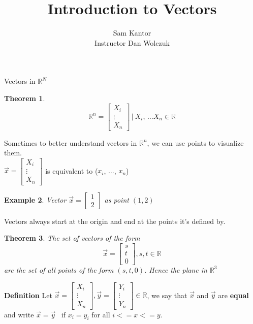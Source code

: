 \documentclass[12pt]{article}
\title{Introduction to Vectors}
\author{Sam Kantor \\ Instructor Dan Wolczuk}
\newtheorem{theorem}{Theorem}[section]
\newtheorem{example}[theorem]{Example}
\begin{document}
\maketitle
\newpage

\Large {Vectors in $\mathbb{R}^N $}
\\
\begin{theorem}
$$  \mathbb{R}^n =
 {\left[\begin{matrix}
    X_i \\ \vdots \\
    X_n
\end{matrix}\right]} \, | \: X_i, \, \dots X_n \in \mathbb{R} $$

\end{theorem}

\Large {Sometimes to better understand vectors in $\mathbb{R}^n$, we can use points to visualize them.} \\

$\vec{x} = {\left[\begin{matrix}
    X_i \\ \vdots \\
    X_n
\end{matrix}\right]}$ is equivalent to ($x_i$, $\dots$, $x_n$)

\begin{example}

Vector $\vec{x} = {\left[\begin{matrix}
    1 \\ 2
\end{matrix}\right]}$ as point $(1,2)$

\end{example}

\Large {Vectors always start at the origin and end at the points it's defined by.}

\begin{theorem}
The set of vectors of the form $$\vec{x} = {\left[\begin{matrix}
    s \\ t \\ 0
\end{matrix}\right]}, s, t \in \mathbb{R}$$ are the set of all points of the form $(s, t, 0)$. Hence the plane in $\mathbb{R}^3$
\end{theorem}

\textbf{Definition}
Let $\vec{x} = {\left[\begin{matrix}
    X_i \\ \vdots \\ X_n
\end{matrix}\right]}, \vec{y} = {\left[\begin{matrix}
    Y_i \\ \vdots \\ Y_n
\end{matrix}\right]} \in \mathbb{R}$, we say that $\vec{x}$ and $\vec{y}$ are \textbf{equal} and write $\vec{x} = \vec{y}$ \, if $x_i = y_i$ for all $i <= x <= y$. \\
\end{document}
